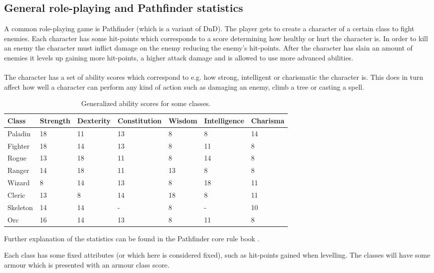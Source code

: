 \documentclass[a4paper,12pt]{article}
\begin{document}
\subsection{General role-playing and Pathfinder statistics}
A common role-playing game is Pathfinder (which is a variant of DnD).
The player gets to create a character of a certain class to fight enemies. Each character has some hit-points which corresponds to a score determining how healthy or hurt the character is. In order to kill an enemy the character must inflict damage on the enemy reducing the enemy's hit-points. After the character has slain an amount of enemies it levels up gaining more hit-points, a higher attack damage and is allowed to use more advanced abilities.
\\
\\
The character has a set of ability scores which correspond to e.g. how strong, intelligent or charismatic the character is. This does in turn affect how well a character can perform any kind of action such as damaging an enemy, climb a tree or casting a spell.

\begin{table}[H] 
	\centering
	\caption{Generalized ability scores for some classes. \label{table:Ability_scores}}
	\begin{tabular}{@{}lllllll@{}}
	\toprule
	Class & Strength & Dexterity & Constitution & Wisdom & Intelligence & Charisma \\ \midrule
 	Paladin & 18 	& 11 	& 13 	& 8 	& 8		& 14 \\
 	Fighter & 18 	& 14 	& 13 	& 8 	& 11 	& 8 \\
 	Rogue 	& 13	& 18 	& 11 	& 8 	& 14 	& 8 \\
 	Ranger 	& 14 	& 18 	& 11 	& 13 	& 8 	& 8 \\
 	Wizard 	& 8 	& 14 	& 13 	& 8 	& 18 	& 11 \\
 	Cleric 	& 13 	& 8 	& 14 	& 18 	& 8 	& 11 \\
 	Skeleton& 14 	& 14 	& - 	& 8 	& - 	& 10 \\
 	Orc 	& 16 	& 14 	& 13 	& 8 	& 11 	& 8 \\ \bottomrule
	\end{tabular}
\end{table}

\noindent
Further explanation of the statistics can be found in the Pathfinder core rule book \cite{rule_book}.

 
\newpage
\noindent
Each class has some fixed attributes (or which here is considered fixed), such as hit-points gained when levelling.
The classes will have some armour which is presented with an armour class score.
\end{document}

